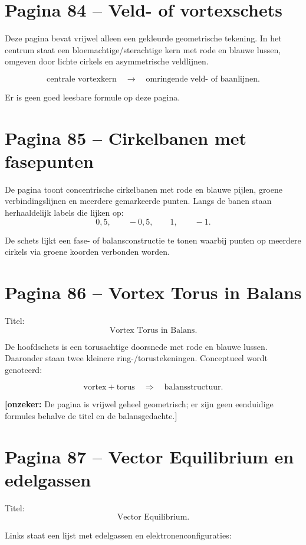 \documentclass[11pt,a4paper]{article}
\newcommand{\onzeker}[1]{\ifmmode\text{\color{red!70!black}\bfseries[onzeker]}\else\textcolor{red!70!black}{\textbf{[onzeker:} #1\textbf{]}}\fi}
\begin{document}
\section*{Pagina 84 -- Veld- of vortexschets}

Deze pagina bevat vrijwel alleen een gekleurde geometrische tekening. In het centrum staat een bloemachtige/sterachtige kern met rode en blauwe lussen, omgeven door lichte cirkels en asymmetrische veldlijnen.

\[
\text{centrale vortexkern}
\quad\longrightarrow\quad
\text{omringende veld- of baanlijnen}.
\]

Er is geen goed leesbare formule op deze pagina.

\section*{Pagina 85 -- Cirkelbanen met fasepunten}

De pagina toont concentrische cirkelbanen met rode en blauwe pijlen, groene verbindingslijnen en meerdere gemarkeerde punten. Langs de banen staan herhaaldelijk labels die lijken op:
\[
0{,}5,\qquad -0{,}5,\qquad 1,\qquad -1.
\]

De schets lijkt een fase- of balansconstructie te tonen waarbij punten op meerdere cirkels via groene koorden verbonden worden.

\section*{Pagina 86 -- Vortex Torus in Balans}

Titel:
\[
\text{Vortex Torus in Balans}.
\]

De hoofdschets is een torusachtige doorsnede met rode en blauwe lussen. Daaronder staan twee kleinere ring-/torustekeningen. Conceptueel wordt genoteerd:

\[
\text{vortex}+\text{torus}
\quad\Rightarrow\quad
\text{balansstructuur}.
\]

\onzeker{De pagina is vrijwel geheel geometrisch; er zijn geen eenduidige formules behalve de titel en de balansgedachte.}

\section*{Pagina 87 -- Vector Equilibrium en edelgassen}

Titel:
\[
\text{Vector Equilibrium}.
\]

Links staat een lijst met edelgassen en elektronenconfiguraties:
\end{document}
